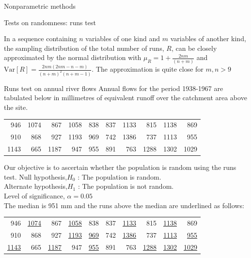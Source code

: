 \documentclass[8pt]{beamer}
\renewcommand{\emph}[1]{\textcolor{myorange}{#1}}
\begin{document}
\begin{frame}{Nonparametric methods}
    \begin{block}{Tests on randomness: runs test}
    \end{block}
    In a sequence containing $n$ variables of one kind and $m$ variables of another kind, the sampling distribution of the total number of runs, $R$, can be closely approximated by the normal distribution with $\mu_R = 1 + \frac{2nm}{(n+m)}$ and $\text{Var}[R] = \frac{2nm(2nm - n - m)}{(n+m)^2 (n+m-1)}$. The approximation is quite close for  $m, n>9$
    \begin{exampleblock}{Runs test on annual river flows}
        Annual flows  for the period 1938-1967 are tabulated below in millimetres of equivalent runoff over the catchment area above the site.
        \vspace{5pt}

  \begin{tabular}{rrrrrrrrrr} %
      946 & 1074 & 867 & 1058 & 838 & 837 & 1133 & 815 & 1138 & 869 \\
      910 & 868 & 927 & 1193 & 969 & 742 & 1386 & 737 & 1113 & 955 \\
      1143 & 665 & 1187 & 947 & 955 & 891 & 763 & 1288 & 1302 & 1029
  \end{tabular}

  Our objective is to ascertain whether the population is random using the \emph{runs test}.
    \emph{Null hypothesis},$H_0$ : The population is random.\\
    \emph{Alternate hypothesis},$H_1$  : The population is not random.\\
    \emph{Level of significance}, $\alpha = 0.05$\\
    The \emph{median} is 951 mm and the \emph{runs} above the \emph{median} are underlined as follows:
         \vspace{5pt}

  \begin{tabular}{rrrrrrrrrr} %
      946 & \underline{1074} & 867 & \underline{1058} & 838 & 837 & \underline{1133} & 815 & \underline{1138} & 869 \\
      910 & 868 & 927 & \underline{1193} & \underline{969} & 742 & \underline{1386} & 737 & \underline{1113} & \underline{955} \\
      \underline{1143} & 665 & \underline{1187} & 947 & \underline{955} & 891 & 763 & \underline{1288} & \underline{1302} & \underline{1029}
  \end{tabular}

 
    \end{exampleblock}
 
    \end{frame}
\end{document}
